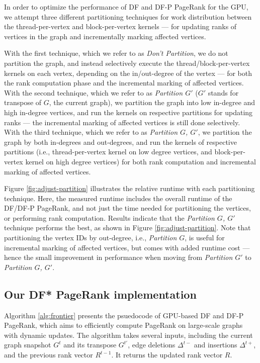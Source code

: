 In order to optimize the performance of DF and DF-P PageRank for the GPU, we attempt three different partitioning techniques for work distribution between the thread-per-vertex and block-per-vertex kernels --- for updating ranks of vertices in the graph and incrementally marking affected vertices.

With the first technique, which we refer to as \textit{Don't Partition}, we do not partition the graph, and instead selectively execute the thread/block-per-vertex kernels on each vertex, depending on the in/out-degree of the vertex --- for both the rank computation phase and the incremental marking of affected vertices. With the second technique, which we refer to as \textit{Partition $G'$} ($G'$ stands for transpose of $G$, the current graph), we partition the graph into low in-degree and high in-degree vertices, and run the kernels on respective partitions for updating ranks --- the incremental marking of affected vertices is still done selectively. With the third technique, which we refer to as \textit{Partition $G$, $G'$}, we partition the graph by both in-degrees and out-degrees, and run the kernels of respective partitions (i.e., thread-per-vertex kernel on low degree vertices, and block-per-vertex kernel on high degree vertices) for both rank computation and incremental marking of affected vertices.

Figure \ref{fig:adjust-partition} illustrates the relative runtime with each partitioning technique. Here, the measured runtime includes the overall runtime of the DF/DF-P PageRank, and not just the time needed for partitioning the vertices, or performing rank computation. Results indicate that the \textit{Partition $G$, $G'$} technique performs the best, as shown in Figure \ref{fig:adjust-partition}. Note that partitioning the vertex IDs by out-degree, i.e., \textit{Partition $G$}, is useful for incremental marking of affected vertices, but comes with added runtime cost --- hence the small improvement in performance when moving from \textit{Partition $G'$} to \textit{Partition $G$, $G'$}.






\subsection{Our DF* PageRank implementation}

Algorithm \ref{alg:frontier} presents the psuedocode of GPU-based DF and DF-P PageRank, which aims to efficiently compute PageRank on large-scale graphs with dynamic updates. The algorithm takes several inputs, including the current graph snapshot $G^t$ and its transpose $G^{t'}$, edge deletions $\Delta^{t-}$ and insertions $\Delta^{t+}$, and the previous rank vector $R^{t-1}$. It returns the updated rank vector $R$.

